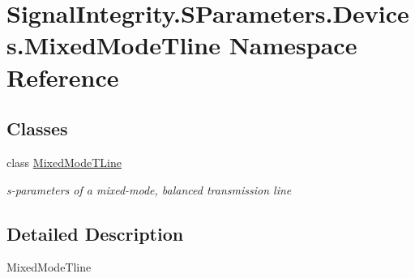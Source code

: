 \hypertarget{namespaceSignalIntegrity_1_1SParameters_1_1Devices_1_1MixedModeTline}{}\section{Signal\+Integrity.\+S\+Parameters.\+Devices.\+Mixed\+Mode\+Tline Namespace Reference}
\label{namespaceSignalIntegrity_1_1SParameters_1_1Devices_1_1MixedModeTline}
\subsection*{Classes}
\begin{DoxyCompactItemize}
\item 
class \hyperlink{classSignalIntegrity_1_1SParameters_1_1Devices_1_1MixedModeTline_1_1MixedModeTLine}{Mixed\+Mode\+T\+Line}
\begin{DoxyCompactList}\small\item\em s-\/parameters of a mixed-\/mode, balanced transmission line \end{DoxyCompactList}\end{DoxyCompactItemize}


\subsection{Detailed Description}
\begin{DoxyVerb}MixedModeTline\end{DoxyVerb}
 